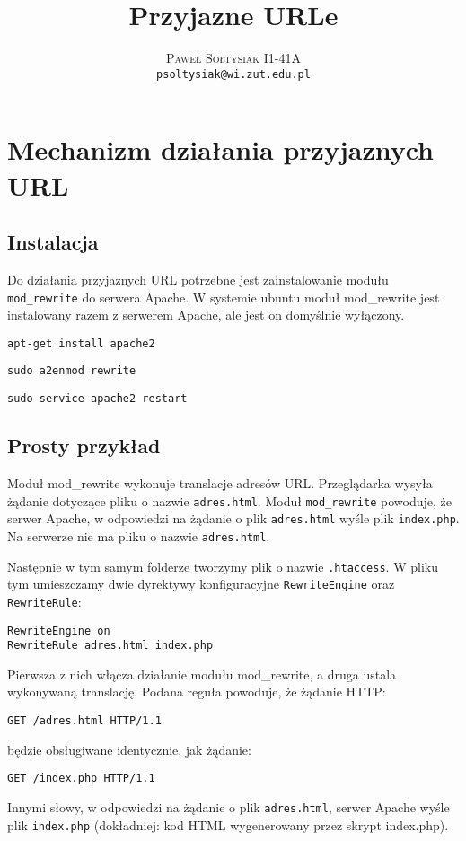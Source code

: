 \documentclass{article}
\title{Przyjazne URLe}
\author{\textsc{Paweł Sołtysiak I1-41A} \\ \texttt{psoltysiak@wi.zut.edu.pl}}
\begin{document}
\maketitle

\section{Mechanizm działania przyjaznych URL}
\subsection{Instalacja}
Do działania przyjaznych URL potrzebne jest zainstalowanie modułu \texttt{mod\_rewrite} do serwera Apache. W systemie ubuntu moduł mod\_rewrite jest instalowany razem z serwerem Apache, ale jest on domyślnie wyłączony.

\texttt{apt-get install apache2}

\texttt{sudo a2enmod rewrite}

\texttt{sudo service apache2 restart}

\subsection{Prosty przykład}
Moduł mod\_rewrite wykonuje translacje adresów URL. Przeglądarka wysyła żądanie dotyczące pliku o nazwie \texttt{adres.html}. Moduł \texttt{mod\_rewrite} powoduje, że serwer Apache, w odpowiedzi na żądanie o plik \texttt{adres.html} wyśle plik \texttt{index.php}. Na serwerze nie ma pliku o nazwie \texttt{adres.html}.

Następnie w tym samym folderze tworzymy plik o nazwie \texttt{.htaccess}. W pliku tym umieszczamy dwie dyrektywy konfiguracyjne \texttt{RewriteEngine} oraz \texttt{RewriteRule}: 

\begin{lstlisting}[caption=plik .htaccess]
RewriteEngine on
RewriteRule adres.html index.php
\end{lstlisting}

Pierwsza z nich włącza działanie modułu mod\_rewrite, a druga ustala wykonywaną translację. Podana reguła powoduje, że żądanie HTTP:

\texttt{GET /adres.html HTTP/1.1}

będzie obsługiwane identycznie, jak żądanie:

\texttt{GET /index.php HTTP/1.1}

Innymi słowy, w odpowiedzi na żądanie o plik \texttt{adres.html}, serwer Apache wyśle plik \texttt{index.php} (dokładniej: kod HTML wygenerowany przez skrypt index.php). 
\end{document}

